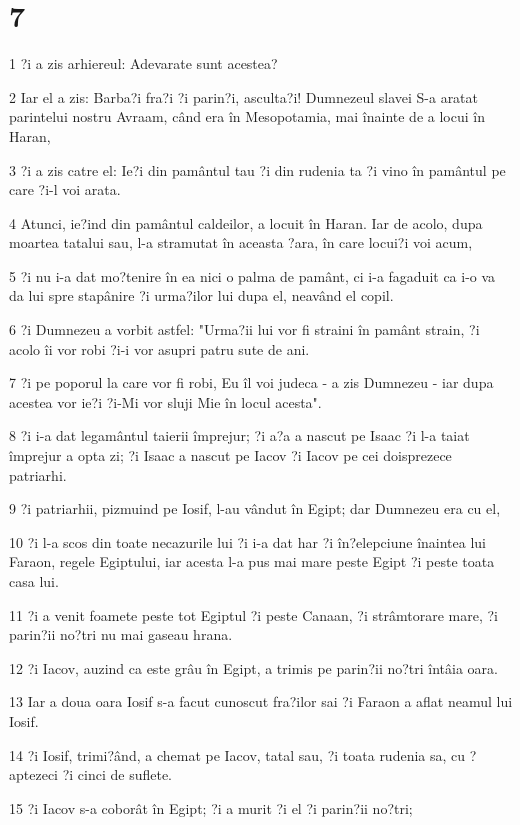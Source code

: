 \chapter{7}

\par 1 ?i a zis arhiereul: Adevarate sunt acestea?
\par 2 Iar el a zis: Barba?i fra?i ?i parin?i, asculta?i! Dumnezeul slavei S-a aratat parintelui nostru Avraam, când era în Mesopotamia, mai înainte de a locui în Haran,
\par 3 ?i a zis catre el: Ie?i din pamântul tau ?i din rudenia ta ?i vino în pamântul pe care ?i-l voi arata.
\par 4 Atunci, ie?ind din pamântul caldeilor, a locuit în Haran. Iar de acolo, dupa moartea tatalui sau, l-a stramutat în aceasta ?ara, în care locui?i voi acum,
\par 5 ?i nu i-a dat mo?tenire în ea nici o palma de pamânt, ci i-a fagaduit ca i-o va da lui spre stapânire ?i urma?ilor lui dupa el, neavând el copil.
\par 6 ?i Dumnezeu a vorbit astfel: "Urma?ii lui vor fi straini în pamânt strain, ?i acolo îi vor robi ?i-i vor asupri patru sute de ani.
\par 7 ?i pe poporul la care vor fi robi, Eu îl voi judeca - a zis Dumnezeu - iar dupa acestea vor ie?i ?i-Mi vor sluji Mie în locul acesta".
\par 8 ?i i-a dat legamântul taierii împrejur; ?i a?a a nascut pe Isaac ?i l-a taiat împrejur a opta zi; ?i Isaac a nascut pe Iacov ?i Iacov pe cei doisprezece patriarhi.
\par 9 ?i patriarhii, pizmuind pe Iosif, l-au vândut în Egipt; dar Dumnezeu era cu el,
\par 10 ?i l-a scos din toate necazurile lui ?i i-a dat har ?i în?elepciune înaintea lui Faraon, regele Egiptului, iar acesta l-a pus mai mare peste Egipt ?i peste toata casa lui.
\par 11 ?i a venit foamete peste tot Egiptul ?i peste Canaan, ?i strâmtorare mare, ?i parin?ii no?tri nu mai gaseau hrana.
\par 12 ?i Iacov, auzind ca este grâu în Egipt, a trimis pe parin?ii no?tri întâia oara.
\par 13 Iar a doua oara Iosif s-a facut cunoscut fra?ilor sai ?i Faraon a aflat neamul lui Iosif.
\par 14 ?i Iosif, trimi?ând, a chemat pe Iacov, tatal sau, ?i toata rudenia sa, cu ?aptezeci ?i cinci de suflete.
\par 15 ?i Iacov s-a coborât în Egipt; ?i a murit ?i el ?i parin?ii no?tri;
